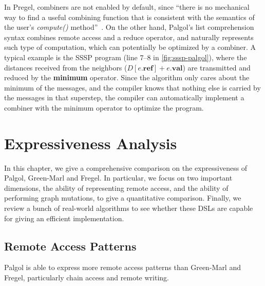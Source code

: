 \documentclass{sokendai_thesis} %
\begin{document}
In Pregel, combiners are not enabled by default, since ``there is no mechanical way to find a useful combining function that is consistent with the semantics of the user's \emph{compute()} method''~\cite{pregel}. %
On the other hand, Palgol's list comprehension syntax combines remote access and a reduce operator, and naturally represents such type of computation, which can potentially be optimized by a combiner.
A typical example is the SSSP program (line 7--8 in \autoref{fig:sssp-palgol}), where the distances received from the neighbors ($D[e.\mathbf{ref}]+e.\mathbf{val}$) are transmitted and reduced by the \textbf{minimum} operator.
Since the algorithm only cares about the minimum of the messages, and the compiler knows that nothing else is carried by the messages in that superstep, the compiler can automatically implement a combiner with the minimum operator to optimize the program.

\chapter{Expressiveness Analysis}
\label{sec:expressiveness}

In this chapter, we give a comprehensive comparison on the expressiveness of Palgol, Green-Marl and Fregel.
In particular, we focus on two important dimensions, the ability of representing remote access, and the ability of performing graph mutations, to give a quantitative comparison.
Finally, we review a bunch of real-world algorithms to see whether these DSLs are capable for giving an efficient implementation.

\section{Remote Access Patterns}

Palgol is able to express more remote access patterns than Green-Marl and Fregel, particularly chain access and remote writing.
\end{document}
